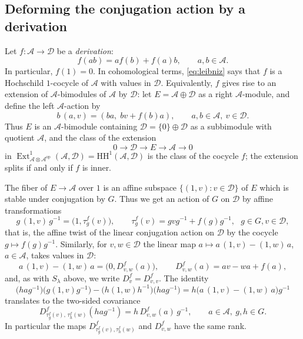 \documentclass[12pt]{article}
\theoremstyle{definition}
\newcommand{\op}{\mathrm{op}}
\newcommand{\HH}{\mathrm{HH}}
\newcommand{\Ext}{\operatorname{Ext}}
\newcommand{\alg}{\mathcal{A}}   %
\newcommand{\bmdl}{\mathcal{D}}   %
\newcommand{\Sop}{S}
\newcommand{\Dop}{D}
\begin{document}
\subsection{Deforming the conjugation action by a derivation}\label{ssec:cov}

Let $f : \alg \to \bmdl$ be a \emph{derivation}:
\begin{equation}\label{eq:leibniz}
   f(ab) = a f(b) + f(a) b, \qquad a,b \in \alg .
\end{equation}
In particular, $f(1) = 0$.
In cohomological terms, \eqref{eq:leibniz} says that $f$ is a
Hochschild $1$-cocycle of $\alg$ with values in $\bmdl$.
Equivalently, $f$ gives rise to an extension of $\alg$-bimodules of
$\alg$ by $\bmdl$: let $E = \alg\oplus \bmdl$ as a right $\alg$-module, and define the left $\alg$-action by
\[
   b\,(a,v) = (ba,\; bv + f(b)a), \qquad a,b \in \alg,\ v \in \bmdl .
\]
Thus $E$ is an $\alg$-bimodule containing $\bmdl = \{0\}\oplus \bmdl$ as a
subbimodule with quotient $\alg$, and the class of the extension
\[
   0 \longrightarrow \bmdl \longrightarrow E \longrightarrow \alg
   \longrightarrow 0
\]
in $\Ext^1_{\alg\otimes\alg^{\op}}(\alg,\bmdl) = \HH^1(\alg,\bmdl)$
is the class of the cocycle $f$; the extension splits if and only if $f$ is inner.

The fiber of $E \to \alg$ over $1$ is an affine subspace $\{(1,v) : v \in \bmdl\}$ of $E$ which is stable
under conjugation by $G$. Thus we get an action of $G$ on $\bmdl$ by affine transformations
\begin{equation}\label{eq:tau}
   g\,(1,v)\,g^{-1} = \bigl(1,\tau^f_g(v)\bigr), \qquad
   \tau^f_g(v) = gvg^{-1} + f(g)g^{-1} ,\ \ \ g\in G, v\in \bmdl,
\end{equation}
that is, the affine twist of the linear conjugation action on $\bmdl$ by the cocycle $g\mapsto f(g)g^{-1}$.
Similarly, for $v,w \in \bmdl$ the linear map $a \mapsto a\,(1,v) - (1,w)\,a$, $a \in
\alg$, takes values in $\bmdl$:
\begin{equation}\label{eq:D}
   a\,(1,v) - (1,w)\,a = \bigl(0, \Dop^f_{v,w}(a)\bigr), \qquad
   \Dop^f_{v,w}(a) = av - wa + f(a) ,
\end{equation}
and, as with $\Sop_\lambda$ above, we write $\Dop^f_v = \Dop^f_{v,v}$.
The identity
\[
   \bigl(hag^{-1}\bigr)\bigl(g(1,v)g^{-1}\bigr) -
   \bigl(h(1,w)h^{-1}\bigr)\bigl(hag^{-1}\bigr)
   = h\bigl(a\,(1,v) - (1,w)\,a\bigr)g^{-1}
\]
translates to the two-sided covariance
\begin{equation}\label{eq:covar}
   \Dop^f_{\tau^f_g(v),\,\tau^f_h(w)}(hag^{-1}) = h\,\Dop^f_{v,w}(a)\,g^{-1},
   \qquad a \in \alg,\ g,h \in G .
\end{equation}
In particular the maps $\Dop^f_{\tau^f_g(v),\tau^f_h(w)}$ and $\Dop^f_{v,w}$ have the same rank.
\end{document}
